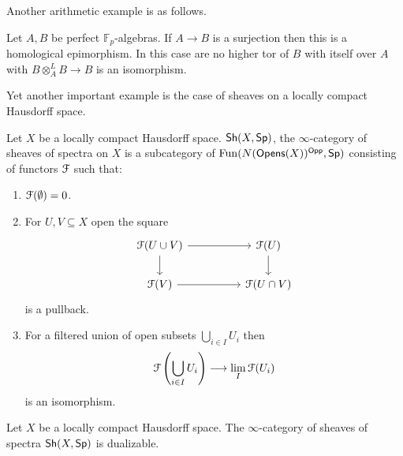 Another arithmetic example is as follows. 
\begin{example}
    Let $A, B$ be perfect $\mathbb{F}_{p}$-algebras. If $A\to B$ is a surjection then this is a homological epimorphism. In this case are no higher tor of $B$ with itself over $A$ with $B\otimes^{L}_{A}B\to B$ is an isomorphism. 
\end{example}
Yet another important example is the case of sheaves on a locally compact Hausdorff space. 
\begin{definition}\label{def: sheaves on a LCH space}
    Let $X$ be a locally compact Hausdorff space. $\mathsf{Sh}(X,\mathsf{Sp})$, the $\infty$-category of sheaves of spectra on $X$ is a subcategory of $\mathrm{Fun}(N(\mathsf{Opens}(X))^{\mathsf{Opp}}, \mathsf{Sp})$ consisting of functors $\EuScript{F}$ such that:
    \begin{enumerate}[label=(\roman*)]
        \item $\EuScript{F}(\emptyset)=0$. 
        \item For $U,V\subseteq X$ open the square 
        $$%
        \begin{tikzcd}
            {\Fscr(U\cup V)} && {\Fscr(U)} \\
            {\Fscr(V)} && {\Fscr(U\cap V)}
            \arrow[from=1-1, to=1-3]
            \arrow[from=1-1, to=2-1]
            \arrow[from=1-3, to=2-3]
            \arrow[from=2-1, to=2-3]
        \end{tikzcd}$$
        is a pullback. 
        \item For a filtered union of open subsets $\bigcup_{i\in I}U_{i}$ then
        $$\EuScript{F}\left(\bigcup_{i\in I}U_{i}\right)\longrightarrow\lim_{I}\EuScript{F}(U_{i})$$
        is an isomorphism.
    \end{enumerate}
\end{definition}
\begin{example}
    Let $X$ be a locally compact Hausdorff space. The $\infty$-category of sheaves of spectra $\mathsf{Sh}(X,\mathsf{Sp})$ is dualizable. 
\end{example}